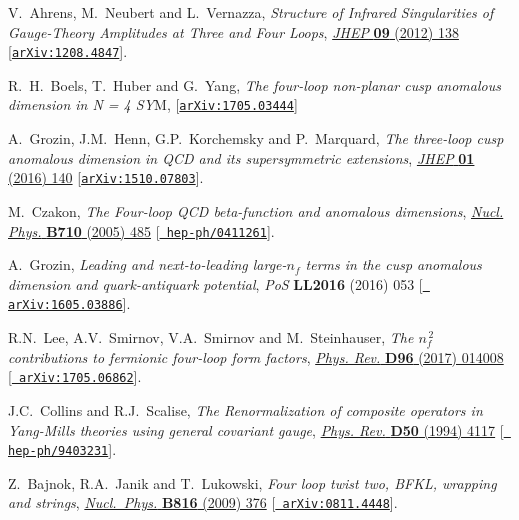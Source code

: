 \documentclass[12pt]{article}
\def\nfs{{n^{\,2}_{\! f}}}
\begin{document}
{\begin{thebibliography}{100}
V.~Ahrens, M.~Neubert and L.~Vernazza, \emph{{Structure of Infrared
  Singularities of Gauge-Theory Amplitudes at Three and Four Loops}},
  \href{https://dx.doi.org/10.1007/JHEP09(2012)138}{\emph{JHEP} {\bf 09} (2012)
  138} [\href{https://arxiv.org/abs/1208.4847}{{\tt arXiv:1208.4847}}].

  R.~H.~Boels, T.~Huber and G.~Yang, \emph{{
  The four-loop non-planar cusp anomalous dimension in N = 4 SY}}M,
  [\href{https://arxiv.org/abs/1705.03444}{{\tt arXiv:1705.03444}}]

A.~Grozin, J.M.~Henn, G.P.~Korchemsky and P.~Marquard, \emph{{The three-loop
  cusp anomalous dimension in QCD and its supersymmetric extensions}},
  \href{https://dx.doi.org/10.1007/JHEP01(2016)140}{\emph{JHEP} {\bf 01} (2016)
  140} [\href{https://arxiv.org/abs/1510.07803}{{\tt arXiv:1510.07803}}].

M.~Czakon, \emph{{The Four-loop QCD beta-function and anomalous dimensions}},
  \href{https://dx.doi.org/10.1016/j.nuclphysb.2005.01.012}{\emph{Nucl. Phys.}
  {\bf B710} (2005) 485} [\href{https://arxiv.org/abs/hep-ph/0411261}{{\tt
  hep-ph/0411261}}].

A.~Grozin, \emph{{Leading and next-to-leading large-$n_f$ terms in the cusp
  anomalous dimension and quark-antiquark potential}}, {\emph{PoS} {\bf LL2016}
  (2016) 053} [\href{https://arxiv.org/abs/1605.03886}{{\tt
  arXiv:1605.03886}}].

R.N.~Lee, A.V.~Smirnov, V.A.~Smirnov and M.~Steinhauser, \emph{{The $\nfs$
  contributions to fermionic four-loop form factors}},
  \href{https://dx.doi.org/10.1103/PhysRevD.96.014008}{\emph{Phys. Rev.} {\bf
  D96} (2017) 014008} [\href{https://arxiv.org/abs/1705.06862}{{\tt
  arXiv:1705.06862}}].

J.C.~Collins and R.J.~Scalise, \emph{{The Renormalization of composite
  operators in Yang-Mills theories using general covariant gauge}},
  \href{https://dx.doi.org/10.1103/PhysRevD.50.4117}{\emph{Phys. Rev.} {\bf
  D50} (1994) 4117} [\href{https://arxiv.org/abs/hep-ph/9403231}{{\tt
  hep-ph/9403231}}].

Z.~Bajnok, R.A.~Janik and T.~Lukowski, \emph{{Four loop twist two, BFKL,
  wrapping and strings}},
  \href{https://dx.doi.org/10.1016/j.nuclphysb.2009.02.005}{\emph{Nucl.~Phys.}
  {\bf B816} (2009) 376} [\href{https://arxiv.org/abs/0811.4448}{{\tt
  arXiv:0811.4448}}].


\end{thebibliography}}
\end{document}
